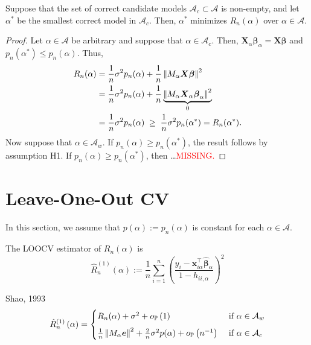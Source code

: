 \documentclass[12pt, letter paper]{article}
\newcommand{\1}{\mathmybb{1}}
\newcommand{\0}{\emptyset}
\newcommand{\prob}{\mathbb{P}}
\newcommand{\paren}[1]{\left(#1 \right)}
\newcommand{\norm}[1]{\left|\hspace{-1pt}\left|#1 \right|\hspace{-1pt}\right|}
\newcommand{\normsq}[1]{\norm{#1}^{2}}
\newcommand{\Acal}{\mathcal{A}}
\newcommand{\X}{\boldsymbol{X}}
\newcommand{\x}{\boldsymbol{x}}
\newcommand{\e}{\boldsymbol{e}}
\newcommand{\bbeta}{\boldsymbol{\beta}}
\newcommand{\bbetahat}{\boldsymbol{\hat{\beta}}}
\newcommand{\Rhat}[2]{\hat{R}_{n}^{#1}\paren{#2}}
\newcommand{\loocv}{\Rhat{(1)}{\alpha}}
\newcommand{\op}[1]{o_{\prob}\paren{#1}}
\begin{document}
\begin{proposition}{}
    Suppose that the set of correct candidate models \(\Acal_{c}\subset\Acal\) is non-empty, and let \(\alpha^{*}\) be the smallest correct model in \(\Acal_{c}\). Then, \(\alpha^{*}\) minimizes \(R_{n}(\alpha)\) over \(\alpha\in\Acal\).
\end{proposition}
\begin{proof}
    Let \(\alpha\in\Acal\) be arbitrary and suppose that \(\alpha\in\Acal_{c}\). Then, \(\X_{\alpha}\bbeta_{\alpha} = \X\bbeta\) and \(p_{n}(\alpha^{*})\leq p_{n}(\alpha)\). Thus,
    \begin{align*}
        R_{n}(\alpha) &= \frac{1}{n}\sigma^{2}p_{n}(\alpha) + \frac{1}{n}\normsq{M_{\alpha}\X\bbeta}\\
        &= \frac{1}{n} \sigma^{2}p_{n}(\alpha) + \frac{1}{n}\underbrace{\normsq{M_{\alpha}\X_{\alpha}\bbeta_{\alpha}}}_{0}\\
        &= \frac{1}{n}\sigma^{2}p_{n}(\alpha)\; \geq \; \frac{1}{n}\sigma^{2}p_{n}(\alpha^{*}) = R_{n}(\alpha^{*}).
    \end{align*}
    Now suppose that \(\alpha\in\Acal_{w}\). If \(p_{n}(\alpha)\geq p_{n}(\alpha^{*})\), the result follows by assumption H1. If \(p_{n}(\alpha)\geq p_{n}(\alpha^{*})\), then \ldots \textcolor{red}{MISSING.}
\end{proof}

\section{Leave-One-Out CV~\cite{shao_linear_1993}}
In this section, we assume that \(p(\alpha):=p_n(\alpha)\) is constant for each \(\alpha\in\Acal\).
\begin{definition}
    The LOOCV estimator of \(R_{n}(\alpha)\) is 
    \[\Rhat{(1)}{\alpha}:= \frac{1}{n}\sum_{i=1}^{n}\paren{\frac{y_{i}-\x_{i\alpha}^{\top}\bbetahat_{\alpha}}{1-h_{ii,\alpha}}}^{2}\]
\end{definition}

\begin{proposition}[Lemma]{{Shao, 1993}}
    \[\loocv = \begin{cases}
        R_{n}(\alpha) + \sigma^{2} + \op{1} &\text{ if }\alpha\in\Acal_{w}\\[2mm]
        \frac{1}{n}\normsq{M_{\alpha}\e} + \frac{2}{n}\sigma^{2}p(\alpha) + \op{n^{-1}} &\text{ if }\alpha\in\Acal_{c}
    \end{cases}\]
\end{proposition}
\end{document}

